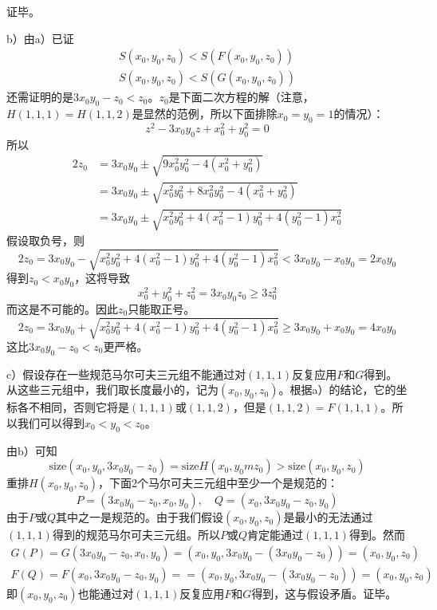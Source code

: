 证毕。\par
b）由a）已证
\begin{gather*}
S(x_0,y_0,z_0) < S(F(x_0,y_0,z_0)) \\
S(x_0,y_0,z_0) < S(G(x_0,y_0,z_0)) 
\end{gather*}
还需证明的是$3x_0y_0-z_0<z_0$。$z_0$是下面二次方程的解（注意，$H(1,1,1)=H(1,1,2)$是显然的范例，所以下面排除$x_0=y_0=1$的情况）：
\[z^2-3x_0y_0z+x_0^2+y_0^2=0\]
所以
\begin{align*}
2z_0&=3x_0y_0\pm\sqrt{9x_0^2y_0^2-4(x_0^2+y_0^2)} \\
&=3x_0y_0\pm\sqrt{x_0^2y_0^2 + 8x_0^2y_0^2 -4(x_0^2+y_0^2)} \\
&=3x_0y_0\pm\sqrt{x_0^2y_0^2 + 4(x_0^2-1)y_0^2 + 4(y_0^2-1)x_0^2} 
\end{align*}
假设取负号，则
\[2z_0=3x_0y_0-\sqrt{x_0^2y_0^2 + 4(x_0^2-1)y_0^2 + 4(y_0^2-1)x_0^2} < 3x_0y_0-x_0y_0 = 2x_0y_0\]
得到$z_0<x_0y_0$，这将导致
\[x_0^2+y_0^2+z_0^2=3x_0y_0z_0\ge3z_0^2\]
而这是不可能的。因此$z_0$只能取正号。
\[2z_0=3x_0y_0+\sqrt{x_0^2y_0^2 + 4(x_0^2-1)y_0^2 + 4(y_0^2-1)x_0^2} \ge 3x_0y_0+x_0y_0 = 4x_0y_0\]
这比$3x_0y_0-z_0<z_0$更严格。\par
c）\proof 假设存在一些规范马尔可夫三元组不能通过对$(1,1,1)$反复应用$F$和$G$得到。从这些三元组中，我们取长度最小的，记为$(x_0,y_0,z_0)$。根据a）的结论，它的坐标各不相同，否则它将是$(1,1,1)$或$(1,1,2)$，但是$(1,1,2)=F(1,1,1)$。所以我们可以得到$x_0<y_0<z_0$。\par
由b）可知
\[\mathrm{size}(x_0, y_0, 3x_0y_0-z_0)=\mathrm{size}H(x_0,y_0mz_0)>\mathrm{size}(x_0,y_0,z_0)\]
重排$H(x_0,y_0,z_0)$，下面2个马尔可夫三元组中至少一个是规范的：
\[P=(3x_0y_0-z_0,x_0, y_0),\quad Q=(x_0,3x_0y_0-z_0, y_0) \]
由于$P$或$Q$其中之一是规范的。由于我们假设$(x_0,y_0,z_0)$是最小的无法通过$(1,1,1)$得到的规范马尔可夫三元组。所以$P$或$Q$肯定能通过$(1,1,1)$得到。然而
\begin{gather*}
  G(P)=G(3x_0y_0-z_0,x_0, y_0)=(x_0, y_0, 3x_0y_0-(3x_0y_0-z_0))=(x_0, y_0, z_0)\\
  F(Q)=F(x_0,3x_0y_0-z_0, y_0)==(x_0, y_0, 3x_0y_0-(3x_0y_0-z_0))=(x_0, y_0, z_0)
\end{gather*}
即$(x_0, y_0, z_0)$也能通过对$(1,1,1)$反复应用$F$和$G$得到，这与假设矛盾。证毕。